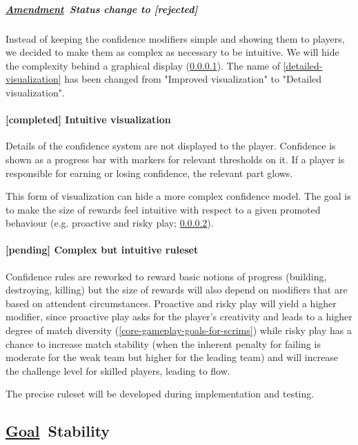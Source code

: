\documentclass{scrartcl}
\newcommand{\goal}     [0]{\textbf{\underline{Goal}\ }}
\newcommand{\pending}  [0]{\textcolor{pending}  {\textbf{[pending] }}}
\newcommand{\rejected} [0]{\textcolor{rejected} {\textbf{[rejected] }}}
\newcommand{\completed}[0]{\textcolor{completed}{\textbf{[completed] }}}
\newcommand{\amendment}[0]{\textbf{\underline{Amendment}\ }}
\begin{document}
\subparagraph{\amendment Status change to \rejected}

Instead of keeping the confidence modifiers simple and showing them to players, we decided to make them as complex as necessary to be intuitive. We will hide the complexity behind a graphical display (\ref{intuitive-visualization}). The name of \ref{detailed-visualization} has been changed from "Improved visualization" to "Detailed visualization".

\paragraph{\completed Intuitive visualization}
\label{intuitive-visualization}

Details of the confidence system are not displayed to the player. Confidence is shown as a progress bar with markers for relevant thresholds on it. If a player is responsible for earning or losing confidence, the relevant part glows.

This form of visualization can hide a more complex confidence model. The goal is to make the size of rewards feel intuitive with respect to a given promoted behaviour (e.g. proactive and risky play; \ref{complex-but-intuitive-ruleset}).

\paragraph{\pending Complex but intuitive ruleset}
\label{complex-but-intuitive-ruleset}

Confidence rules are reworked to reward basic notions of progress (building, destroying, killing) but the size of rewards will also depend on modifiers that are based on attendent circumstances. Proactive and risky play will yield a higher modifier, since proactive play asks for the player's creativity and leads to a higher degree of match diversity (\ref{core-gameplay-goals-for-scrims}) while risky play has a chance to increase match stability (when the inherent penalty for failing is moderate for the weak team but higher for the leading team) and will increase the challenge level for skilled players, leading to flow.

The precise ruleset will be developed during implementation and testing.

\subsection{\goal Stability}
\end{document}
